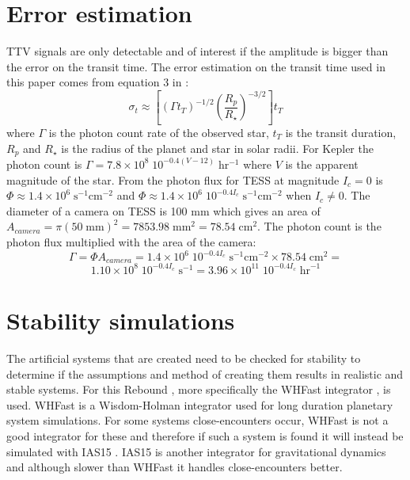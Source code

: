 \documentclass[12pt]{report}
\begin{document}
\section{Error estimation}
	TTV signals are only detectable and of interest if the amplitude is bigger than the error on the transit time. The error estimation on the transit time used in this paper comes from equation 3 in \cite{2005Sci...307.1288H}:
	\begin{equation}
		\sigma_t \approx \left[\left(\Gamma t_T\right)^{-1/2}  \left(\frac{R_p}{R_{\star}}\right)^{-3/2}\right] t_T
	\end{equation}
	where $\Gamma$ is the photon count rate of the observed star, $t_T$ is the transit duration, $R_p$ and $R_{\star}$ is the radius of the planet and star in solar radii. For Kepler the photon count is $\Gamma = 7.8 \times 10^8\; 10^{-0.4(V-12)} \; \mathrm{hr^{-1}}$ where $V$ is the apparent magnitude of the star. From \cite{2015ApJ...809...77S} the photon flux for TESS at magnitude $I_c=0$ is $\Phi \approx 1.4 \times 10^6 \; \mathrm{s^{-1} cm^{-2}}$ and $\Phi \approx 1.4 \times 10^6 \; 10^{-0.4I_c} \; \mathrm{s^{-1} cm^{-2}}$ when $I_c \neq 0$. The diameter of a camera on TESS is 100 mm which gives an area of $A_{camera} = \pi (50 \; \mathrm{mm})^2 = 7853.98 \; \mathrm{mm}^2 = 78.54 \; \mathrm{cm}^2$. The photon count is the photon flux multiplied with the area of the camera:
	\begin{equation}
		\Gamma = \Phi A_{camera} = 1.4 \times 10^6\; 10^{-0.4I_c} \; \mathrm{s^{-1} cm^{-2}} \times 78.54 \; \mathrm{cm}^2 = 
	\end{equation}
	\begin{equation*}
	1.10 \times 10^{8}\; 10^{-0.4I_c} \; \mathrm{s}^{-1} = 3.96 \times 10^{11} \; 10^{-0.4I_c} \; \mathrm{hr}^{-1}
	\end{equation*}
	
\section{Stability simulations}
	The artificial systems that are created need to be checked for stability to determine if the assumptions and method of creating them results in realistic and stable systems. For this Rebound \citep{2012A&A...537A.128R}, more specifically the WHFast integrator \citep{2015MNRAS.452..376R}, is used. WHFast is a Wisdom-Holman integrator used for long duration planetary system simulations. For some systems close-encounters occur, WHFast is not a good integrator for these and therefore if such a system is found it will instead be simulated with IAS15 \citep{2015MNRAS.446.1424R}. IAS15 is another integrator for gravitational dynamics and although slower than WHFast it handles close-encounters better.
	
\end{document}
